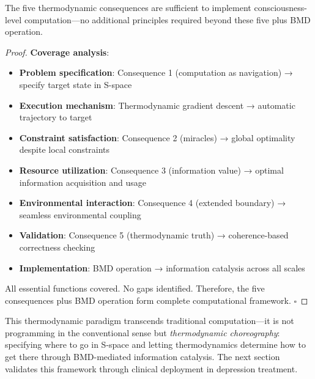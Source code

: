 \begin{theorem}
\label{thm:thermodynamic_completeness}
The five thermodynamic consequences are sufficient to implement consciousness-level computation—no additional principles required beyond these five plus BMD operation.
\end{theorem}

\begin{proof}
\textbf{Coverage analysis}:

\begin{itemize}
\item \textbf{Problem specification}: Consequence 1 (computation as navigation) → specify target state in S-space
\item \textbf{Execution mechanism}: Thermodynamic gradient descent → automatic trajectory to target
\item \textbf{Constraint satisfaction}: Consequence 2 (miracles) → global optimality despite local constraints
\item \textbf{Resource utilization}: Consequence 3 (information value) → optimal information acquisition and usage
\item \textbf{Environmental interaction}: Consequence 4 (extended boundary) → seamless environmental coupling
\item \textbf{Validation}: Consequence 5 (thermodynamic truth) → coherence-based correctness checking
\item \textbf{Implementation}: BMD operation → information catalysis across all scales
\end{itemize}

All essential functions covered. No gaps identified. Therefore, the five consequences plus BMD operation form complete computational framework. $\square$
\end{proof}

This thermodynamic paradigm transcends traditional computation—it is not programming in the conventional sense but \textit{thermodynamic choreography}: specifying where to go in S-space and letting thermodynamics determine how to get there through BMD-mediated information catalysis. The next section validates this framework through clinical deployment in depression treatment.

